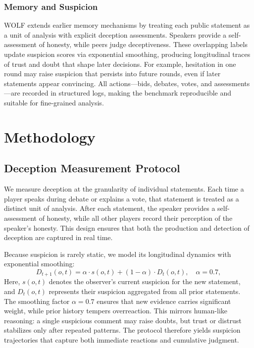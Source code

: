 \documentclass{article}
\begin{document}
\subsubsection*{Memory and Suspicion}
WOLF extends earlier memory mechanisms \cite{bailis2024werewolfarenacasestudy} by treating each public statement as a unit of analysis with explicit deception assessments. Speakers provide a self-assessment of honesty, while peers judge deceptiveness. These overlapping labels update suspicion scores via exponential smoothing, producing longitudinal traces of trust and doubt that shape later decisions. For example, hesitation in one round may raise suspicion that persists into future rounds, even if later statements appear convincing. All actions—bids, debates, votes, and assessments—are recorded in structured logs, making the benchmark reproducible and suitable for fine-grained analysis.  


\section{Methodology}
\label{sec:Method}
\subsection{Deception Measurement Protocol}
\label{subsec:deception-protocol}
We measure deception at the granularity of individual statements. Each time a player speaks during debate or explains a vote, that statement is treated as a distinct unit of analysis. After each statement, the speaker provides a self-assessment of honesty, while all other players record their perception of the speaker’s honesty. This design ensures that both the production and detection of deception are captured in real time.

Because suspicion is rarely static, we model its longitudinal dynamics with exponential smoothing:
\[
D_{t+1}(o,t) = \alpha \cdot s(o,t) + (1-\alpha)\cdot D_{t}(o,t), \quad \alpha=0.7,
\]
Here, $s(o,t)$ denotes the observer’s current suspicion for the new statement, and $D_t(o,t)$ represents their suspicion aggregated from all prior statements. The smoothing factor $\alpha = 0.7$ ensures that new evidence carries significant weight, while prior history tempers overreaction. This mirrors human-like reasoning: a single suspicious comment may raise doubts, but trust or distrust stabilizes only after repeated patterns. The protocol therefore yields suspicion trajectories that capture both immediate reactions and cumulative judgment.
\end{document}

